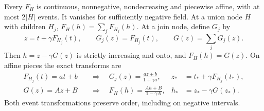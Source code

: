 \begin{lemma}
\label{lem:op3-module-response}
Every $F_H$ is continuous, nonnegative, nondecreasing and piecewise affine,
with at most $2|H|$ events. It vanishes for sufficiently negative field.
At a union node $H$ with children $H_j$,
$F_H(h)=\sum_jF_{H_j}(h)$. At a join node, define $G_j$ by
\begin{equation}
 z=t+\gamma F_{H_j}(t),\qquad G_j(z)=F_{H_j}(t),\qquad
 G(z)=\sum_jG_j(z).
 \label{eq:op3-join-input-transform}
\end{equation}
Then $h=z-\gamma G(z)$ is strictly increasing and onto, and
$F_H(h)=G(z)$. On affine pieces the exact transforms are
\begin{align}
 F_{H_j}(t)=at+b
 &\quad\Longrightarrow\quad
 G_j(z)=\frac{az+b}{1+\gamma a},
 &z_*&=t_*+\gamma F_{H_j}(t_*),
 \label{eq:op3-module-child-piece}\\
 G(z)=Az+B
 &\quad\Longrightarrow\quad
 F_H(h)=\frac{Ah+B}{1-\gamma A},
 &h_*&=z_*-\gamma G(z_*).
 \label{eq:op3-module-parent-piece}
\end{align}
Both event transformations preserve order, including on negative intervals.
\end{lemma}
